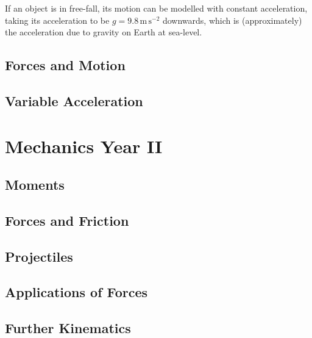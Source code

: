     If an object is in free-fall, its motion can be modelled with constant acceleration, taking its acceleration to be $g=9.8\,\text{m}\,\text{s}^{-2}$ downwards, which is (approximately) the acceleration due to gravity on Earth at sea-level.

    \newpage

\subsection{Forces and Motion} \label{forces_and_motion}

    \newpage

\subsection{Variable Acceleration} \label{variable_acceleration}

    \newpage

\section{Mechanics Year II} \label{mechanics_ii}
\subsection{Moments} \label{moments}

    \newpage

\subsection{Forces and Friction} \label{forces_and_friction}

    \newpage

\subsection{Projectiles} \label{projectiles}

    \newpage

\subsection{Applications of Forces} \label{applications_of_forces}

    \newpage

\subsection{Further Kinematics} \label{further_kinematics}

    \newpage